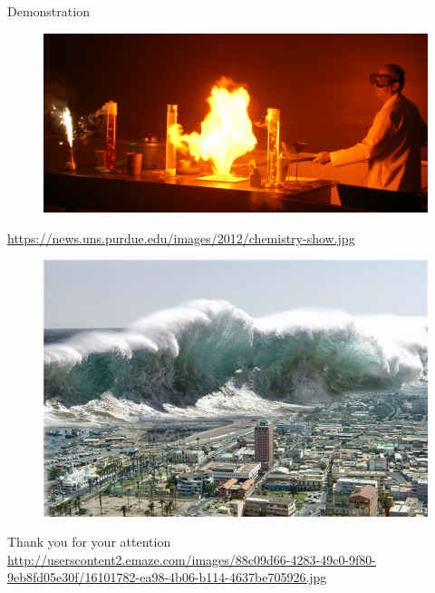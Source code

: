 \documentclass[shortpres,usenames,dvipsnames]{beamer}
\newcommand{\imgfullscale}{0.75}
\begin{document}
\begin{frame}[fragile]{Demonstration}
	\begin{figure}
		\includegraphics[clip, width=\linewidth]{img/demo.jpeg}
	\end{figure}
	
	\vfill
	\flushleft
	{\fontsize{5}{5} \selectfont \url{https://news.uns.purdue.edu/images/2012/chemistry-show.jpg}}
\end{frame}

\begin{frame}{}
	\begin{figure}
		\includegraphics[clip, width=\imgfullscale\linewidth]{img/tsunami.jpg}
	\end{figure}
	\centering
	\vspace{10pt}
	Thank you for your attention
	\\
	\vfill
	\flushleft
	{\fontsize{5}{5} \selectfont \url{http://userscontent2.emaze.com/images/88c09d66-4283-49c0-9f80-9eb8fd05e30f/16101782-ea98-4b06-b114-4637be705926.jpg}}
\end{frame}
\end{document}
